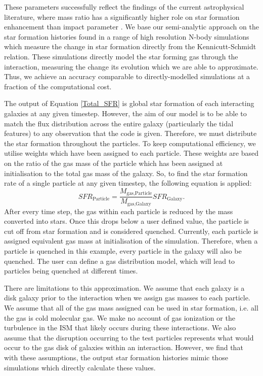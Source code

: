 These parameters successfully reflect the findings of the current astrophysical literature, where mass ratio has a significantly higher role on star formation enhancement than impact parameter \citep{2003ApJ...582..668B, 2008MNRAS.391.1137L, 2008MNRAS.385.1903L}. We base our semi-analytic approach on the star formation histories found in a range of high resolution N-body simulations \citep{1996ApJ...464..641M, 2000MNRAS.312..859S, 2019MNRAS.490.2139R} which measure the change in star formation directly from the Kennicutt-Schmidt \citep{1998ApJ...498..541K} relation. These simulations directly model the star forming gas through the interaction, measuring the change its evolution which we are able to approximate. Thus, we achieve an accuracy comparable to directly-modelled simulations at a fraction of the computational cost.

The output of Equation \ref{Total_SFR} is global star formation of each interacting galaxies at any given timestep. However, the aim of our model is to be able to match the flux distribution across the entire galaxy (particularly the tidal features) to any observation that the code is given. Therefore, we must distribute the star formation throughout the particles. To keep computational efficiency, we utilise weights which have been assigned to each particle. These weights are based on the ratio of the gas mass of the particle which has been assigned at initialisation to the total gas mass of the galaxy. So, to find the star formation rate of a single particle at any given timestep, the following equation is applied:
\begin{equation}
SFR_{\text{Particle}} = \frac{M_{\text{gas,Particle}}}{M_{\text{gas,Galaxy}}}SFR_{\text{Galaxy}}.
\end{equation}
After every time step, the gas within each particle is reduced by the mass converted into stars. Once this drops below a user defined value, the particle is cut off from star formation and is considered quenched. Currently, each particle is assigned equivalent gas mass at initialisation of the simulation. Therefore, when a particle is quenched in this example, every particle in the galaxy will also be quenched. The user can define a gas distribution model, which will lead to particles being quenched at different times.

There are limitations to this approximation. We assume that each galaxy is a disk galaxy prior to the interaction when we assign gas masses to each particle. We assume that all of the gas mass assigned can be used in star formation, i.e. all the gas is cold molecular gas. We make no account of gas ionization or the turbulence in the ISM that likely occurs during these interactions. We also assume that the disruption occurring to the test particles represents what would occur to the gas disk of galaxies within an interaction. However, we find that with these assumptions, the output star formation histories mimic those simulations which directly calculate these values. 

